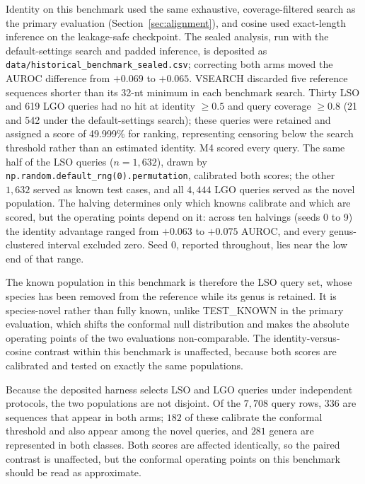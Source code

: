 \documentclass[11pt]{article}
\begin{document}
Identity on this benchmark used the same exhaustive, coverage-filtered search
as the primary evaluation (Section~\ref{sec:alignment}), and cosine used
exact-length inference on the leakage-safe checkpoint. The sealed analysis, run
with the default-settings search and padded inference, is deposited as
\texttt{data/historical\_benchmark\_sealed.csv}; correcting both arms moved the
AUROC difference from $+0.069$ to $+0.065$.
VSEARCH discarded five reference sequences shorter than its 32-nt minimum in
each benchmark search. Thirty LSO and 619 LGO queries had no hit at identity
$\geq0.5$ and query coverage $\geq0.8$ (21 and 542 under the default-settings
search); these queries were retained and assigned a score of 49.999\%
for ranking, representing censoring below the search threshold rather than an
estimated identity. M4 scored every query. The same half of the LSO queries
($n=1{,}632$), drawn by \texttt{np.random.default\_rng(0).permutation},
calibrated both scores; the other $1{,}632$ served as known test cases, and all
$4{,}444$ LGO queries served as the novel population. The halving determines
only which knowns calibrate and which are scored, but the operating points
depend on it: across ten halvings (seeds 0 to 9) the identity advantage ranged
from $+0.063$ to $+0.075$ AUROC, and every genus-clustered interval excluded
zero. Seed 0, reported throughout, lies near the low end of that range.

The known population in this benchmark is therefore the LSO query set, whose
species has been removed from the reference while its genus is retained. It is
species-novel rather than fully known, unlike TEST\_KNOWN in the primary
evaluation, which shifts the conformal null distribution and makes the absolute
operating points of the two evaluations non-comparable. The identity-versus-cosine
contrast within this benchmark is unaffected, because both scores are calibrated
and tested on exactly the same populations.

Because the deposited harness selects LSO and LGO queries under independent
protocols, the two populations are not disjoint. Of the $7{,}708$ query rows,
$336$ are sequences that appear in both arms; $182$ of these calibrate the
conformal threshold and also appear among the novel queries, and $281$ genera
are represented in both classes. Both scores are affected identically, so the
paired contrast is unaffected, but the conformal operating points on this
benchmark should be read as approximate.

\end{document}
